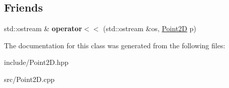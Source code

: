 \subsection*{Friends}
\begin{DoxyCompactItemize}
\item 
std\+::ostream \& {\bfseries operator$<$$<$} (std\+::ostream \&os, \hyperlink{class_point2_d}{Point2D} p)\hypertarget{class_point2_d_ab2e0b3a6cc5bb00c00577261fe50c68c}{}\label{class_point2_d_ab2e0b3a6cc5bb00c00577261fe50c68c}

\end{DoxyCompactItemize}


The documentation for this class was generated from the following files\+:\begin{DoxyCompactItemize}
\item 
include/Point2\+D.\+hpp\item 
src/Point2\+D.\+cpp\end{DoxyCompactItemize}

